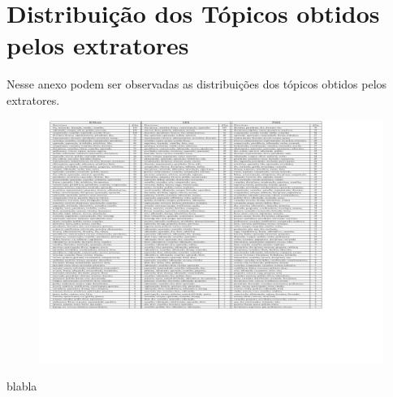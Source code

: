\chapter{ Distribuição dos Tópicos obtidos pelos extratores}\label{apendice3}




Nesse anexo podem ser observadas as distribuições dos tópicos obtidos pelos extratores.



\begin{landscape}%







\begin{figure}[h]
\center
	\includegraphics[trim={ 40 600 200 0 }, page=1,width=1.2\textwidth]{anexos/tabelas/distribuicao-topicos/distribuicao-topicos.pdf}
\end{figure}





\begin{table}[b]
	\caption{blabla}
\end{table}




\end{landscape}

